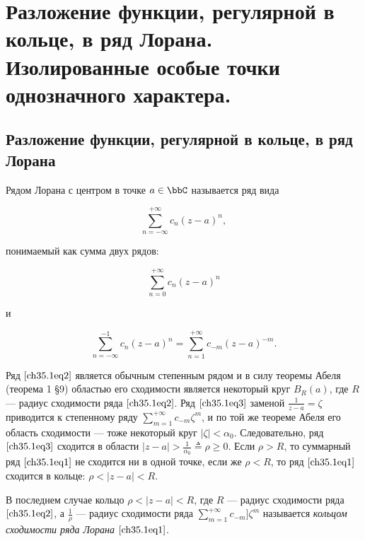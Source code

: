\chapter{Разложение функции, регулярной в кольце, в ряд Лорана. Изолированные особые точки однозначного характера.}
\section{Разложение функции, регулярной в кольце, в ряд Лорана}

\begin{defn}
Рядом Лорана с центром в точке $a \in \bbC$ называется ряд вида

\begin{equation} \label{ch35.1eq1}
\sum\limits_{n = -\infty}^{+\infty} c_n (z - a)^n,
\end{equation}

понимаемый как сумма двух рядов:

\begin{equation} \label{ch35.1eq2}
\sum\limits_{n = 0}^{+\infty} c_n (z - a)^n
\end{equation}

и

\begin{equation} \label{ch35.1eq3}
\sum\limits_{n = -\infty}^{-1} c_n (z - a)^n = \sum\limits_{n = 1}^{+\infty} c_{-m} (z - a)^{-m}.
\end{equation}

\end{defn}

Ряд $\eqref{ch35.1eq2}$ является обычным степенным рядом и в силу теоремы Абеля (теорема 1 \S 9) областью его сходимости является некоторый круг $B_R(a)$, где $R$ --- радиус сходимости ряда $\eqref{ch35.1eq2}$. Ряд $\eqref{ch35.1eq3}$ заменой $\frac{1}{z - a} = \zeta$ приводится к степенному ряду $\sum\limits_{m = 1}^{+\infty}c_{-m} \zeta^m$, и по той же теореме Абеля его область сходимости --- тоже некоторый круг $|\zeta| < \alpha_0$. Следовательно, ряд $\eqref{ch35.1eq3}$ сходится в области $|z - a| > \frac{1}{\alpha_0} \triangleq \rho \ge 0$. Если $\rho > R$, то суммарный ряд $\eqref{ch35.1eq1}$ не сходится ни в одной точке, если же $\rho < R$, то ряд $\eqref{ch35.1eq1}$ сходится в кольце: $\rho < |z - a| < R$.

В последнем случае кольцо $\rho < |z - a| < R$, где $R$ --- радиус сходимости ряда $\eqref{ch35.1eq2}$, а $\frac{1}{\rho}$ --- радиус сходимости ряда $\sum\limits_{m = 1}^{+\infty} c_{-m} ]\zeta^m$ называется \textit{кольцом сходимости ряда Лорана} $\eqref{ch35.1eq1}$.

